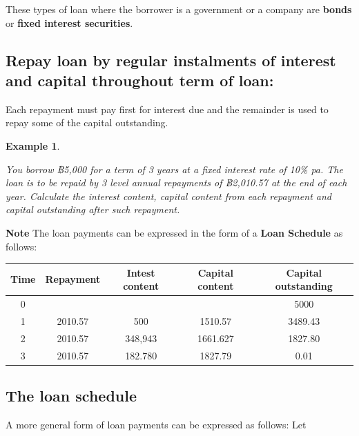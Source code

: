 \documentclass[landscape, 20pt]{extreport}
\theoremstyle{definition}
\theoremstyle{definition}
\newtheorem{example}{Example}[chapter]
\theoremstyle{definition}
\theoremstyle{definition}
\theoremstyle{remark}
\begin{document}
These types of loan where the borrower is a government or a company are
\textbf{bonds} or \textbf{fixed interest securities}.

\hypertarget{repay-loan-by-regular-instalments-of-interest-and-capital-throughout-term-of-loan}{%
\subsection*{Repay loan by regular instalments of interest and capital throughout term of loan:}\label{repay-loan-by-regular-instalments-of-interest-and-capital-throughout-term-of-loan}}

Each repayment must pay first for interest due and the remainder is used
to repay some of the capital outstanding.

\newpage \begin{example}
\protect\hypertarget{exm:unlabeled-div-41}{}\label{exm:unlabeled-div-41}

\emph{You borrow ฿5,000 for a term of 3 years at a fixed
interest rate of 10\% pa. The loan is to be repaid by 3 level annual
repayments of ฿2,010.57 at the end of each year. Calculate the interest
content, capital content from each repayment and capital outstanding
after such repayment.}

\end{example}

\textbf{Note} The loan payments can be expressed in the form of a \textbf{Loan
Schedule} as follows:

\begin{longtable}[]{@{}ccccc@{}}
\toprule
Time & Repayment & Intest content & Capital content & Capital outstanding \\
\midrule
\endhead
0 & & & & 5000 \\
1 & 2010.57 & 500 & 1510.57 & 3489.43 \\
2 & 2010.57 & 348,943 & 1661.627 & 1827.80 \\
3 & 2010.57 & 182.780 & 1827.79 & 0.01 \\
\bottomrule
\end{longtable}

\hypertarget{the-loan-schedule}{%
\subsection{The loan schedule}\label{the-loan-schedule}}

A more general form of loan payments can be expressed as follows: Let
\end{document}

